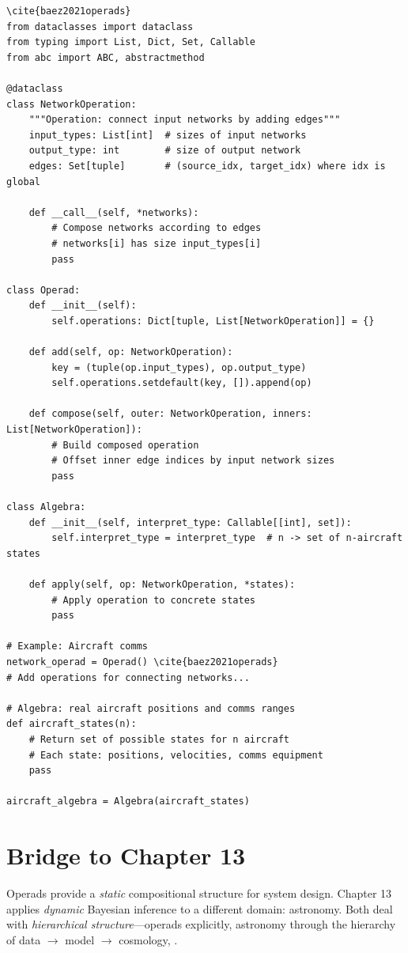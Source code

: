 \begin{lstlisting}[style=python,caption=Network operad sketch] \cite{baez2021operads}
from dataclasses import dataclass
from typing import List, Dict, Set, Callable
from abc import ABC, abstractmethod

@dataclass
class NetworkOperation:
    """Operation: connect input networks by adding edges"""
    input_types: List[int]  # sizes of input networks
    output_type: int        # size of output network
    edges: Set[tuple]       # (source_idx, target_idx) where idx is global
    
    def __call__(self, *networks):
        # Compose networks according to edges
        # networks[i] has size input_types[i]
        pass

class Operad:
    def __init__(self):
        self.operations: Dict[tuple, List[NetworkOperation]] = {}
    
    def add(self, op: NetworkOperation):
        key = (tuple(op.input_types), op.output_type)
        self.operations.setdefault(key, []).append(op)
    
    def compose(self, outer: NetworkOperation, inners: List[NetworkOperation]):
        # Build composed operation
        # Offset inner edge indices by input network sizes
        pass

class Algebra:
    def __init__(self, interpret_type: Callable[[int], set]):
        self.interpret_type = interpret_type  # n -> set of n-aircraft states
    
    def apply(self, op: NetworkOperation, *states):
        # Apply operation to concrete states
        pass

# Example: Aircraft comms
network_operad = Operad() \cite{baez2021operads}
# Add operations for connecting networks...

# Algebra: real aircraft positions and comms ranges
def aircraft_states(n):
    # Return set of possible states for n aircraft
    # Each state: positions, velocities, comms equipment
    pass

aircraft_algebra = Algebra(aircraft_states)
\end{lstlisting}

\section{Bridge to Chapter 13}
\label{sec:op:bridge}

Operads provide a \emph{static} compositional structure for system design. Chapter 13 applies \emph{dynamic} Bayesian inference to a different domain: astronomy. Both deal with \emph{hierarchical structure}---operads explicitly, astronomy through the hierarchy of data $\to$ model $\to$ cosmology, \cite{baez2021operads}.

